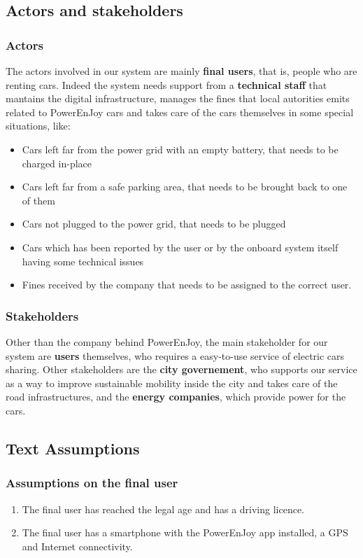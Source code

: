 \documentclass[11pt]{article} %
\newcommand{\pe}{PowerEnJoy }
\newcommand{\pecomma}{PowerEnJoy, }
\begin{document}
\subsection{Actors and stakeholders}

\subsubsection{Actors}
The actors involved in our system are mainly \textbf{final users}, that is, people who are renting cars. Indeed the system needs support from a \textbf{technical staff} that mantains the digital infrastructure, manages the fines that local autorities emits related to \pe cars and takes care of the cars themselves in some special situations, like:
\begin{itemize}[noitemsep]
	\item Cars left far from the power grid with an empty battery, that needs to be charged in-place
	\item Cars left far from a safe parking area, that needs to be brought back to one of them
	\item Cars not plugged to the power grid, that needs to be plugged
	\item Cars which has been reported by the user or by the onboard system itself having some technical issues
	\item Fines received by the company that needs to be assigned to the correct user.
\end{itemize}

\subsubsection{Stakeholders}
Other than the company behind \pecomma the main stakeholder for our system are \textbf{users} themselves, who requires a easy-to-use service of electric cars sharing. Other stakeholders are the \textbf{city governement}, who supports our service as a way to improve sustainable mobility inside the city and takes care of the road infrastructures, and the \textbf{energy companies}, which provide power for the cars.

\subsection{Text Assumptions}

\subsubsection{Assumptions on the final user}
\begin{enumerate}
	\item The final user has reached the legal age and has a driving licence.
	\item The final user has a smartphone with the \pe app installed, a GPS and Internet connectivity.
\end{enumerate}
  
\end{document}
